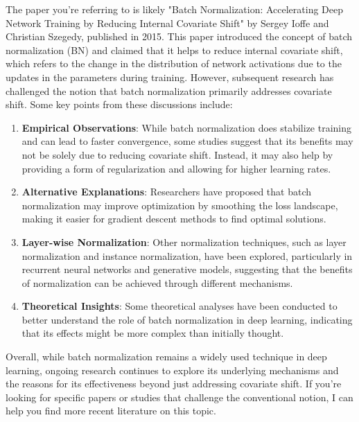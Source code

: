 \begin{botresponse}

The paper you're referring to is likely "Batch Normalization: Accelerating Deep Network Training by Reducing Internal Covariate Shift" by Sergey Ioffe and Christian Szegedy, published in 2015. This paper introduced the concept of batch normalization (BN) and claimed that it helps to reduce internal covariate shift, which refers to the change in the distribution of network activations due to the updates in the parameters during training.
However, subsequent research has challenged the notion that batch normalization primarily addresses covariate shift. Some key points from these discussions include:

\begin{enumerate}
\item \textbf{Empirical Observations}: While batch normalization does stabilize training and can lead to faster convergence, some studies suggest that its benefits may not be solely due to reducing covariate shift. Instead, it may also help by providing a form of regularization and allowing for higher learning rates.
\item \textbf{Alternative Explanations}: Researchers have proposed that batch normalization may improve optimization by smoothing the loss landscape, making it easier for gradient descent methods to find optimal solutions.
\item \textbf{Layer-wise Normalization}: Other normalization techniques, such as layer normalization and instance normalization, have been explored, particularly in recurrent neural networks and generative models, suggesting that the benefits of normalization can be achieved through different mechanisms.
\item \textbf{Theoretical Insights}: Some theoretical analyses have been conducted to better understand the role of batch normalization in deep learning, indicating that its effects might be more complex than initially thought.
\end{enumerate}

Overall, while batch normalization remains a widely used technique in deep learning, ongoing research continues to explore its underlying mechanisms and the reasons for its effectiveness beyond just addressing covariate shift. If you're looking for specific papers or studies that challenge the conventional notion, I can help you find more recent literature on this topic.

\end{botresponse}

